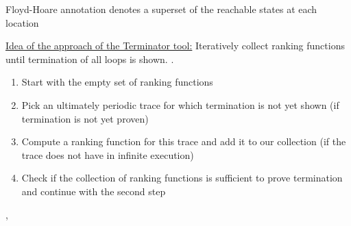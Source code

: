 \documentclass[landscape, a4paper]{article}
\begin{document}
\begin{minipage}[t]{0.2\linewidth}
\begin{betterlist}
\begin{betterlist}
\begin{betterlist}
				\item Floyd-Hoare annotation denotes a superset of the reachable states at each location
			\end{betterlist}
		\end{betterlist}
		\item \underline{Idea of the approach of the Terminator tool:} Iteratively collect ranking functions until termination of all loops is shown. . 
		\begin{enumerate}
			\item Start with the empty set of ranking functions
			\item Pick an ultimately periodic trace for which termination is not yet shown (if termination is not yet proven)
			\item Compute a ranking function for this trace and add it to our collection (if the trace does not have in infinite execution)
			\item Check if the collection of ranking functions is sufficient to prove termination and continue with the second step
		\end{enumerate}
		\item {}, 
	\end{betterlist}
\end{minipage}
\end{document}

